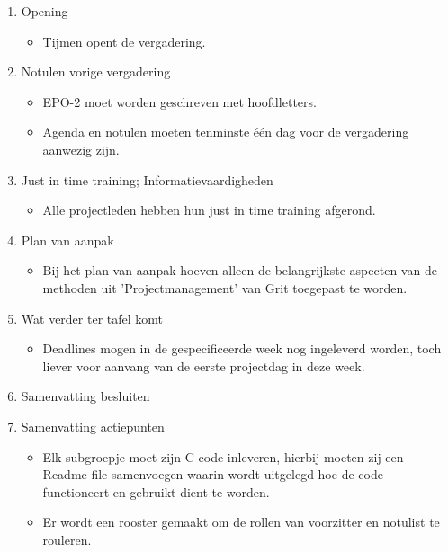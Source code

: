 \documentclass[dutch]{article}
\begin{document}
\begin{enumerate}

\item Opening
\begin{itemize}
\item Tijmen opent de vergadering.
\end{itemize}
\item Notulen vorige vergadering
\begin{itemize}
\item EPO-2 moet worden geschreven met hoofdletters.
\item Agenda en notulen moeten tenminste één dag voor de vergadering aanwezig zijn.
\end{itemize}
\item Just in time training; Informatievaardigheden
\begin{itemize}
\item Alle projectleden hebben hun just in time training afgerond.
\end{itemize}
\item Plan van aanpak
\begin{itemize}
\item Bij het plan van aanpak hoeven alleen de belangrijkste aspecten van de methoden uit 'Projectmanagement' van Grit toegepast te worden.
\end{itemize}
\item Wat verder ter tafel komt
\begin{itemize}
\item Deadlines mogen in de gespecificeerde week nog ingeleverd worden, toch liever voor aanvang van de eerste projectdag in deze week.
\end{itemize}
\item Samenvatting besluiten
\item Samenvatting actiepunten
\begin{itemize}
\item Elk subgroepje moet zijn C-code inleveren, hierbij moeten zij een Readme-file samenvoegen waarin wordt uitgelegd hoe de code functioneert en gebruikt dient te worden.
\item Er wordt een rooster gemaakt om de rollen van voorzitter en notulist te rouleren.
\end{itemize}
\end{enumerate}
\end{document}
